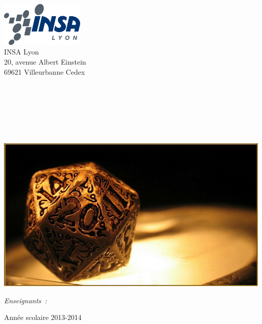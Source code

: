 \begin{center}
	\thispagestyle{empty}
	\begin{minipage}[t]{0.48\textwidth}
	  \begin{flushleft}
	    \includegraphics [width=40mm]{img/insa_logo.png} \\[0.5cm]
			INSA Lyon\\
			20, avenue Albert Einstein\\
			69621 Villeurbanne Cedex
	  \end{flushleft}
	\end{minipage}
	\begin{minipage}[t]{0.48\textwidth}
	  \begin{flushright}
	  \end{flushright}
	\end{minipage} \\[2cm]

	\textsc{\Large \reportsubject}\\[0.3cm]
	\HRule \\[0.4cm]
	{\Huge \bfseries \reporttitle}\\[0.6cm]
	{\Large \dateperiod}\\[0.4cm]
	\HRule \\[1cm]

	\includegraphics [width=0.6\linewidth]{img/die.jpg} \\[0.7cm]
	\begin{minipage}[t]{0.4\textwidth}
	  \begin{flushleft} \large
	    \Large \reportauthor
	  \end{flushleft}
	\end{minipage}
	\begin{minipage}[t]{0.5\textwidth}
	  \begin{flushright} \large
	   \Large \emph{Enseignants~:} \\
	    \enseignants
	  \end{flushright}
	\end{minipage}

	\vfill
	\large Année scolaire 2013-2014
	\clearpage
\end{center}

